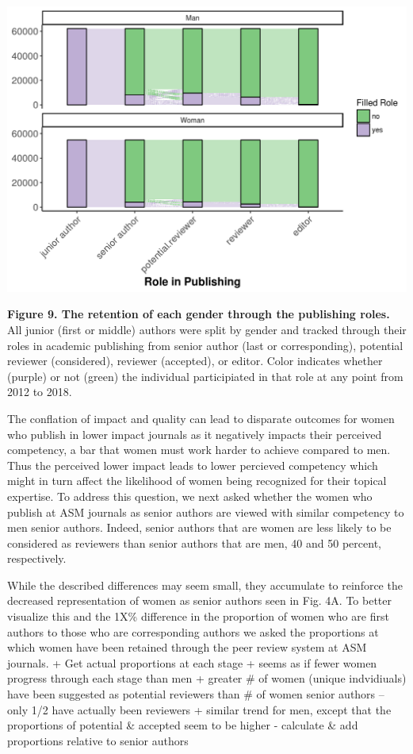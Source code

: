 \documentclass[11pt,]{article}
\begin{document}
\includegraphics{Figure_5.png}

\textbf{Figure 9. The retention of each gender through the publishing
roles.} All junior (first or middle) authors were split by gender and
tracked through their roles in academic publishing from senior author
(last or corresponding), potential reviewer (considered), reviewer
(accepted), or editor. Color indicates whether (purple) or not (green)
the individual participiated in that role at any point from 2012 to
2018.

The conflation of impact and quality can lead to disparate outcomes for
women who publish in lower impact journals as it negatively impacts
their perceived competency, a bar that women must work harder to achieve
compared to men. Thus the perceived lower impact leads to lower
percieved competency which might in turn affect the likelihood of women
being recognized for their topical expertise. To address this question,
we next asked whether the women who publish at ASM journals as senior
authors are viewed with similar competency to men senior authors.
Indeed, senior authors that are women are less likely to be considered
as reviewers than senior authors that are men, 40 and 50 percent,
respectively.

While the described differences may seem small, they accumulate to
reinforce the decreased representation of women as senior authors seen
in Fig. 4A. To better visualize this and the 1X\% difference in the
proportion of women who are first authors to those who are corresponding
authors we asked the proportions at which women have been retained
through the peer review system at ASM journals. + Get actual proportions
at each stage + seems as if fewer women progress through each stage than
men + greater \# of women (unique indvidiuals) have been suggested as
potential reviewers than \# of women senior authors -- only 1/2 have
actually been reviewers + similar trend for men, except that the
proportions of potential \& accepted seem to be higher - calculate \&
add proportions relative to senior authors
\end{document}

